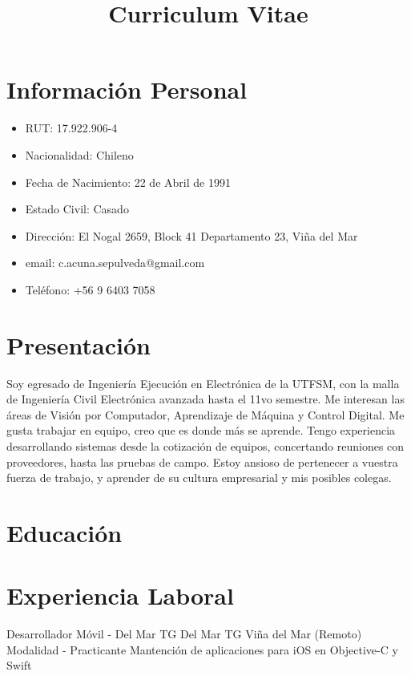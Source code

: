 \documentclass[10pt,letterpaper,sans]{moderncv}
\title{Curriculum Vitae}
\begin{document}
\makecvtitle

\section{Información Personal}
\label{sec:orgfa4e788}
\begin{itemize}
\item RUT: 17.922.906-4
\item Nacionalidad: Chileno
\item Fecha de Nacimiento: 22 de Abril de 1991
\item Estado Civil: Casado
\item Dirección: El Nogal 2659, Block 41 Departamento 23, Viña del Mar
\item email: c.acuna.sepulveda@gmail.com
\item Teléfono: +56 9 6403 7058
\end{itemize}
\section{Presentación}
\label{sec:org93c8601}
Soy egresado de Ingeniería Ejecución en Electrónica de la UTFSM, con
la malla de Ingeniería Civil Electrónica avanzada hasta el 11vo semestre. Me interesan
las áreas de Visión por Computador, Aprendizaje de Máquina y Control Digital.
Me gusta trabajar en equipo, creo que es donde más se aprende. Tengo experiencia
desarrollando sistemas desde la cotización de equipos, concertando reuniones con
proveedores, hasta las pruebas de campo. Estoy ansioso de pertenecer a vuestra
fuerza de trabajo, y aprender de su cultura empresarial y mis posibles colegas. 
\section{Educación}
\label{sec:org0bb4669}
\section{Experiencia Laboral}
\label{sec:org6f89432}
{Desarrollador Móvil - Del Mar TG}
{Del Mar TG}
{Viña del Mar (Remoto)}
{Modalidad - Practicante}
{Mantención de aplicaciones para iOS en Objective-C y Swift}
\end{document}

